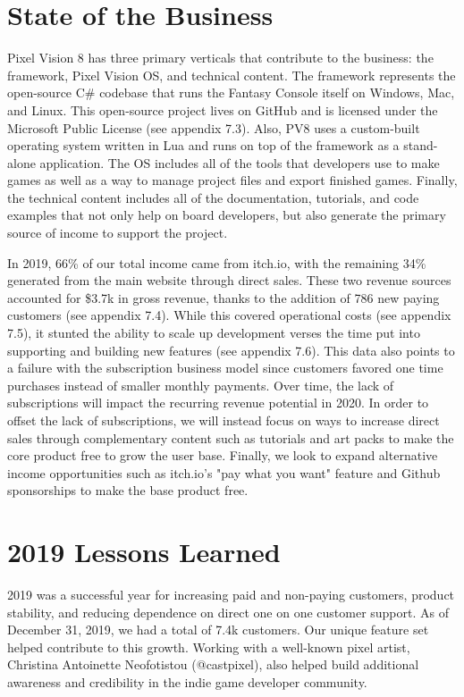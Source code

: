 \documentclass{sixpage}
\begin{document}
    \section{State of the Business}
    Pixel Vision 8 has three primary verticals that contribute to the business: the framework, Pixel Vision OS, and technical content.
    The framework represents the open-source C\# codebase that runs the Fantasy Console itself on Windows, Mac, and Linux.
    This open-source project lives on GitHub and is licensed under the Microsoft Public License (see appendix 7.3).
    Also, PV8 uses a custom-built operating system written in Lua and runs on top of the framework as a stand-alone application.
    The OS includes all of the tools that developers use to make games as well as a way to manage project files and export finished games.
    Finally, the technical content includes all of the documentation, tutorials, and code examples that not only help on board developers, but also generate the primary source of income to support the project.

    In 2019, 66\% of our total income came from itch.io, with the remaining 34\% generated from the main website through direct sales.
    These two revenue sources accounted for \$3.7k in gross revenue, thanks to the addition of 786 new paying customers (see appendix 7.4).
    While this covered operational costs (see appendix 7.5), it stunted the ability to scale up development verses the time put into supporting and building new features (see appendix 7.6).
    This data also points to a failure with the subscription business model since customers favored one time purchases instead of smaller monthly payments.
    Over time, the lack of subscriptions will impact the recurring revenue potential in 2020.
    In order to offset the lack of subscriptions, we will instead focus on ways to increase direct sales through complementary content such as tutorials and art packs to make the core product free to grow the user base.
    Finally, we look to expand alternative income opportunities such as itch.io's "pay what you want" feature and Github sponsorships to make the base product free.


    \section{2019 Lessons Learned}
    2019 was a successful year for increasing paid and non-paying customers, product stability, and reducing dependence on direct one on one customer support.
    As of December 31, 2019, we had a total of 7.4k customers.
    Our unique feature set helped contribute to this growth.
    Working with a well-known pixel artist, Christina Antoinette Neofotistou (@castpixel), also helped build additional awareness and credibility in the indie game developer community.
\end{document}
